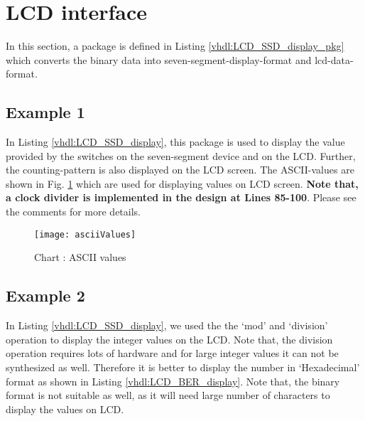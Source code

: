 

\section{LCD interface}\label{sec:LCDinterface}
In this section, a package is defined in Listing \ref{vhdl:LCD_SSD_display_pkg} which converts the binary data into seven-segment-display-format and lcd-data-format. 

\subsection{Example 1}
In Listing \ref{vhdl:LCD_SSD_display}, this package is used to display the value provided by the switches on the seven-segment device and on the LCD. Further, the counting-pattern is also displayed on the LCD screen. The ASCII-values are shown in Fig. \ref{fig:asciiValues} which are used for displaying values on LCD screen. \textbf{Note that, a clock divider is implemented in the design at Lines 85-100}. Please see the comments for more details. 

\begin{figure}[!h]
	\centering
	\texttt{[image: asciiValues]}
	\caption{Chart : ASCII values }
	\label{fig:asciiValues}
\end{figure}





\subsection{Example 2}

In Listing \ref{vhdl:LCD_SSD_display}, we used the the `mod' and `division' operation to display the integer values on the LCD. Note that, the division operation requires lots of hardware and for large integer values it can not be synthesized as well. Therefore it is better to display the number in `Hexadecimal' format as shown in Listing \ref{vhdl:LCD_BER_display}. Note that, the binary format is not suitable as well, as it will need large number of characters to display the values on LCD. 

